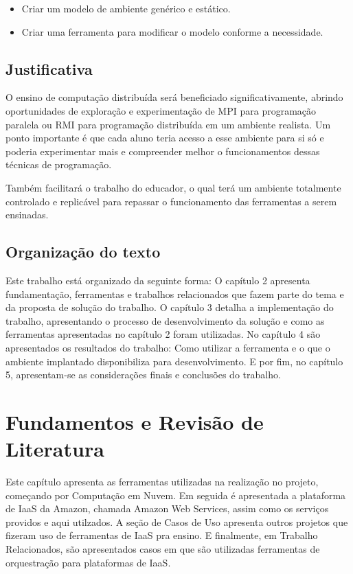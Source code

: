 \documentclass[tg]{mdtufsm}
\begin{document}
\begin{itemize}
\item Criar um modelo de ambiente genérico e estático.
\item Criar uma ferramenta para modificar o modelo conforme a necessidade.
\end{itemize}

\section{Justificativa}

O ensino de computação distribuída será beneficiado significativamente, abrindo oportunidades de exploração e experimentação de MPI para programação paralela ou RMI para programação distribuída em um ambiente realista. Um ponto importante é que cada aluno teria acesso a esse ambiente para si só e poderia experimentar mais e compreender melhor o funcionamentos dessas técnicas de programação.

Também facilitará o trabalho do educador, o qual terá um ambiente totalmente controlado e replicável para repassar o funcionamento das ferramentas a serem ensinadas.

\section{Organização do texto}

Este trabalho está organizado da seguinte forma: O capítulo 2 apresenta fundamentação, ferramentas e trabalhos relacionados que fazem parte do tema e da proposta de solução do trabalho.
O capítulo 3 detalha a implementação do trabalho, apresentando o processo de desenvolvimento da solução e como as ferramentas apresentadas no capítulo 2 foram utilizadas.
No capítulo 4 são apresentados os resultados do trabalho: Como utilizar a ferramenta e o que o ambiente implantado disponibiliza para desenvolvimento. E por fim, no capítulo 5, apresentam-se as considerações finais e conclusões do trabalho.

\chapter{Fundamentos e Revisão de Literatura}

Este capítulo apresenta as ferramentas utilizadas na realização no projeto, começando por Computação em Nuvem. Em seguida é apresentada a plataforma de IaaS da Amazon, chamada Amazon Web Services, assim como os serviços providos e aqui utilzados. A seção de Casos de Uso apresenta outros projetos que fizeram uso de ferramentas de IaaS pra ensino. E finalmente, em Trabalho Relacionados, são apresentados casos em que são utilizadas ferramentas de orquestração para plataformas de IaaS.
\end{document}
